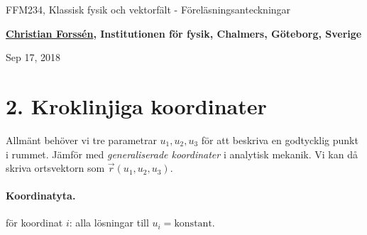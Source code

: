 \documentclass[%
oneside,                 %
final,                   %
10pt]{article}
\begin{document}

\newcommand{\exercisesection}[1]{\subsection*{#1}}







\thispagestyle{empty}

\begin{center}
{\LARGE\bf
\begin{spacing}{1.25}
FFM234, Klassisk fysik och vektorfält - Föreläsningsanteckningar
\end{spacing}
}
\end{center}


\begin{center}
{\bf \href{{http://fy.chalmers.se/subatom/tsp/}}{Christian Forssén}, Institutionen för fysik, Chalmers, Göteborg, Sverige${}^{}$} \\ [0mm]
\end{center}

\begin{center}
\end{center}
    

\begin{center}
Sep 17, 2018
\end{center}

\vspace{1cm}


\section*{2. Kroklinjiga koordinater}

Allmänt behöver vi tre parametrar $u_1, u_2, u_3$ för att beskriva en godtycklig punkt i rummet. Jämför med \emph{generaliserade koordinater} i analytisk mekanik. Vi kan då skriva ortsvektorn som $\vec{r}(u_1, u_2, u_3)$.  

\paragraph{Koordinatyta.}
för koordinat $i$: alla lösningar till $u_i = \mathrm{konstant}$.
\end{document}
